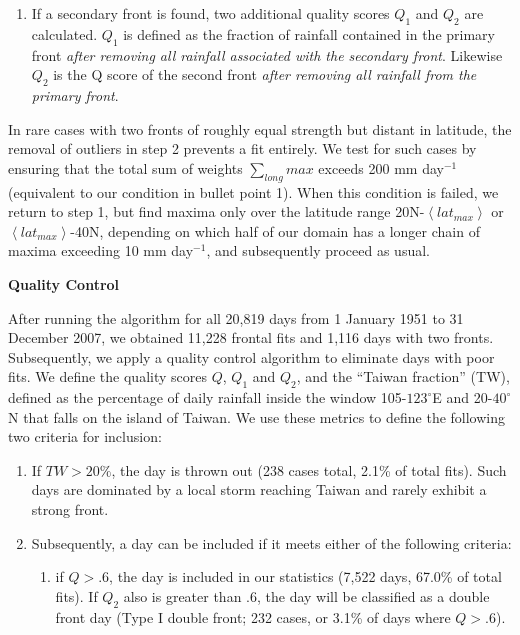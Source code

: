 \documentclass[draft,grl]{agutexSI}
\begin{document}
\begin{article}
\begin{enumerate}
	\item If a secondary front is found, two additional quality scores $Q_1$ and $Q_2$ are calculated. $Q_1$ is defined as the fraction of rainfall contained in the primary front \textit{after removing all rainfall associated with the secondary front}. Likewise $Q_2$ is the Q score of the second front \textit{after removing all rainfall from the primary front}.		
	
\end{enumerate} 

In rare cases with two fronts of roughly equal strength but distant in latitude, the removal of outliers in step 2 prevents a fit entirely. We test for such cases by ensuring that the total sum of weights ${\sum_{long} max}$ exceeds 200 mm day$^{-1}$ (equivalent to our condition in bullet point 1). When this condition is failed, we return to step 1, but find maxima only over the latitude range 20N-$\left<lat_{max}\right>$ or $\left<lat_{max}\right>$-40N, depending on which half of our domain has a longer chain of maxima exceeding 10 mm day$^{-1}$, and subsequently proceed as usual.

\noindent\textbf{Quality Control}

After running the algorithm for all 20,819 days from 1 January 1951 to 31 December 2007, we obtained 11,228 frontal fits and 1,116 days with two fronts. Subsequently, we apply a quality control algorithm to eliminate days with poor fits. We define the quality scores $Q$, $Q_1$ and $Q_2$, and the ``Taiwan fraction'' (TW), defined as the percentage of daily rainfall inside the window 105-$123^{\circ}$E and 20-$40^{\circ}$N that falls on the island of Taiwan. We use these metrics to define the following two criteria for inclusion:

\begin{enumerate}

	\item If $TW > 20\%$, the day is thrown out (238 cases total, 2.1\% of total fits). Such days are dominated by a local storm reaching Taiwan and rarely exhibit a strong front.  
	
	\item Subsequently, a day can be included if it meets either of the following criteria:
	
	\begin{enumerate} 
	
	\item if $Q>.6$, the day is included in our statistics (7,522 days, 67.0\% of total fits). If $Q_2$ also is greater than .6, the day will be classified as a double front day (Type I double front; 232 cases, or 3.1\% of days where $Q>.6$).
		

\end{enumerate}
\end{enumerate}
\end{article}
\end{document}
